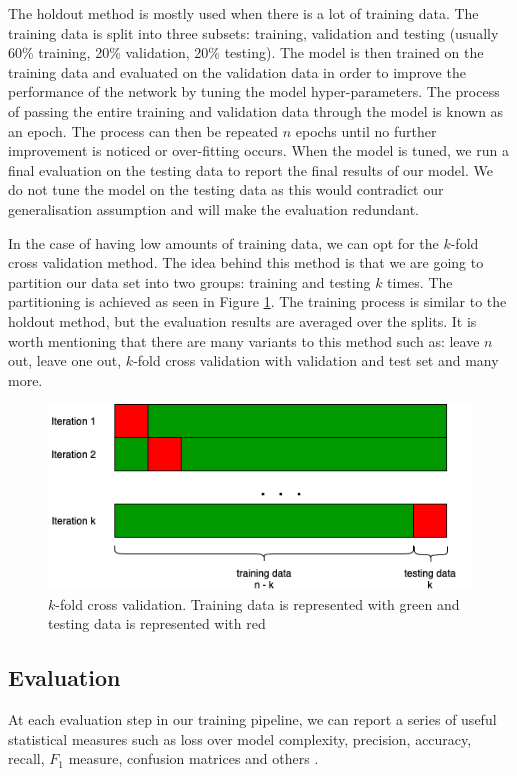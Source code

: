The holdout method is mostly used when there is a lot of training data. The training data is split into three subsets: training, validation and testing (usually 60\% training, 20\% validation, 20\% testing). The model is then trained on the training data and evaluated on the validation data in order to improve the performance of the network by tuning the model hyper-parameters. The process of passing the entire training and validation data through the model is known as an epoch. The process can then be repeated $n$ epochs until no further improvement is noticed or over-fitting occurs. When the model is tuned, we run a final evaluation on the testing data to report the final results of our model. We do not tune the model on the testing data as this would contradict our generalisation assumption and will make the evaluation redundant.

In the case of having low amounts of training data, we can opt for the $k$-fold cross validation method. The idea behind this method is that we are going to partition our data set into two groups: training and testing $k$ times. The partitioning is achieved as seen in Figure \ref{fig:cross_fold}. The training process is similar to the holdout method, but the evaluation results are averaged over the splits. It is worth mentioning that there are many variants to this method such as: leave $n$ out, leave one out, $k$-fold cross validation with validation and test set and many more.

\begin{figure}[h!]
  \centering
  \includegraphics[scale=0.5]{images/cross_fold.png}
  \caption{$k$-fold cross validation. Training data is represented with green and testing data is represented with red}
  \label{fig:cross_fold}
\end{figure}


\subsection{Evaluation}
At each evaluation step in our training pipeline, we can report a series of useful statistical measures such as loss over model complexity, precision, accuracy, recall, $F_1$ measure, confusion matrices and others \cite{ml, russell2016artificial, Goodfellow-et-al-2016}.

